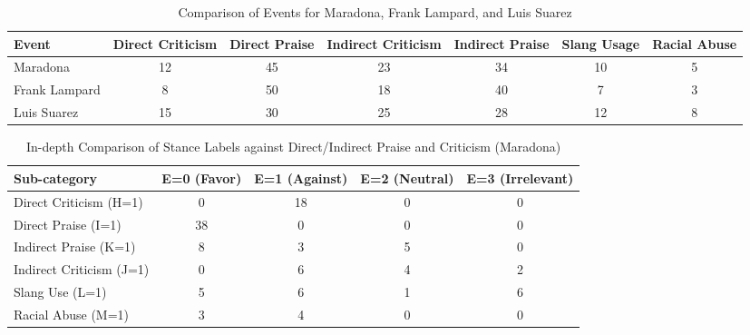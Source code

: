 \documentclass{article}
\begin{document}
\begin{table}[htbp]
    \centering
    \caption{Comparison of Events for Maradona, Frank Lampard, and Luis Suarez}
    \label{tab:events}
    \renewcommand{\arraystretch}{1.2} %
    \begin{adjustbox}{max width=\linewidth} %
        \begin{tabular}{l c c c c c c} 
            \toprule
            \textbf{Event} & \textbf{Direct Criticism} & \textbf{Direct Praise} & \textbf{Indirect Criticism} & \textbf{Indirect Praise} & \textbf{Slang Usage} & \textbf{Racial Abuse} \\
            \midrule
            Maradona & 12 & 45 & 23 & 34 & 10 & 5 \\
            Frank Lampard & 8 & 50 & 18 & 40 & 7 & 3 \\
            Luis Suarez & 15 & 30 & 25 & 28 & 12 & 8 \\
            \bottomrule
        \end{tabular}
    \end{adjustbox}
\end{table}

\FloatBarrier %

\begin{table}[htbp] %
    \centering %
    \caption{In-depth Comparison of Stance Labels against Direct/Indirect Praise and Criticism (Maradona) } %
    \label{tab:statistical_summary} %
    \renewcommand{\arraystretch}{1.2} %
    \begin{adjustbox}{max width=\linewidth} %
        \begin{tabular}{l c c c c} %
            \toprule %
            \textbf{Sub-category} & \textbf{E=0 (Favor)} & \textbf{E=1 (Against)} & \textbf{E=2 (Neutral)} & \textbf{E=3 (Irrelevant)} \\ %
            \midrule %
            Direct Criticism (H=1)  & 0  & 18 & 0  & 0 \\
            Direct Praise (I=1)     & 38 & 0  & 0  & 0 \\
            Indirect Praise (K=1)   & 8  & 3  & 5  & 0 \\
            Indirect Criticism (J=1) & 0  & 6  & 4  & 2 \\
            Slang Use (L=1)         & 5  & 6  & 1  & 6 \\
            Racial Abuse (M=1)      & 3  & 4  & 0  & 0 \\
            \bottomrule %
        \end{tabular}
    \end{adjustbox}
\end{table}
\end{document}
